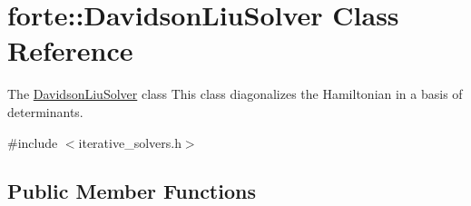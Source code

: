 \hypertarget{classforte_1_1_davidson_liu_solver}{}\section{forte\+:\+:Davidson\+Liu\+Solver Class Reference}
\label{classforte_1_1_davidson_liu_solver}


The \mbox{\hyperlink{classforte_1_1_davidson_liu_solver}{Davidson\+Liu\+Solver}} class This class diagonalizes the Hamiltonian in a basis of determinants.  




{\ttfamily \#include $<$iterative\+\_\+solvers.\+h$>$}

\subsection*{Public Member Functions}
